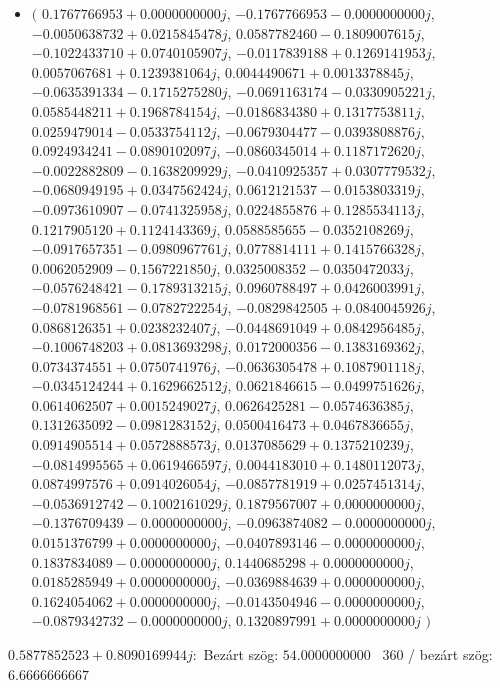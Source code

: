 \documentclass[14pt,a4paper]{article}
\begin{document}
\begin{itemize}
\item
$\big($
$0.1767766953+0.0000000000j$, $-0.1767766953-0.0000000000j$, $-0.0050638732+0.0215845478j$, $0.0587782460-0.1809007615j$, $-0.1022433710+0.0740105907j$, $-0.0117839188+0.1269141953j$, $0.0057067681+0.1239381064j$, $0.0044490671+0.0013378845j$, $-0.0635391334-0.1715275280j$, $-0.0691163174-0.0330905221j$, $0.0585448211+0.1968784154j$, $-0.0186834380+0.1317753811j$, $0.0259479014-0.0533754112j$, $-0.0679304477-0.0393808876j$, $0.0924934241-0.0890102097j$, $-0.0860345014+0.1187172620j$, $-0.0022882809-0.1638209929j$, $-0.0410925357+0.0307779532j$, $-0.0680949195+0.0347562424j$, $0.0612121537-0.0153803319j$, $-0.0973610907-0.0741325958j$, $0.0224855876+0.1285534113j$, $0.1217905120+0.1124143369j$, $0.0588585655-0.0352108269j$, $-0.0917657351-0.0980967761j$, $0.0778814111+0.1415766328j$, $0.0062052909-0.1567221850j$, $0.0325008352-0.0350472033j$, $-0.0576248421-0.1789313215j$, $0.0960788497+0.0426003991j$, $-0.0781968561-0.0782722254j$, $-0.0829842505+0.0840045926j$, $0.0868126351+0.0238232407j$, $-0.0448691049+0.0842956485j$, $-0.1006748203+0.0813693298j$, $0.0172000356-0.1383169362j$, $0.0734374551+0.0750741976j$, $-0.0636305478+0.1087901118j$, $-0.0345124244+0.1629662512j$, $0.0621846615-0.0499751626j$, $0.0614062507+0.0015249027j$, $0.0626425281-0.0574636385j$, $0.1312635092-0.0981283152j$, $0.0500416473+0.0467836655j$, $0.0914905514+0.0572888573j$, $0.0137085629+0.1375210239j$, $-0.0814995565+0.0619466597j$, $0.0044183010+0.1480112073j$, $0.0874997576+0.0914026054j$, $-0.0857781919+0.0257451314j$, $-0.0536912742-0.1002161029j$, $0.1879567007+0.0000000000j$, $-0.1376709439-0.0000000000j$, $-0.0963874082-0.0000000000j$, $0.0151376799+0.0000000000j$, $-0.0407893146-0.0000000000j$, $0.1837834089-0.0000000000j$, $0.1440685298+0.0000000000j$, $0.0185285949+0.0000000000j$, $-0.0369884639+0.0000000000j$, $0.1624054062+0.0000000000j$, $-0.0143504946-0.0000000000j$, $-0.0879342732-0.0000000000j$, $0.1320897991+0.0000000000j$
$\big)$
\end{itemize}
$0.5877852523+0.8090169944j$:\
Bezárt szög: $54.0000000000$ \
360 / bezárt szög: $6.6666666667$\
\end{document}
